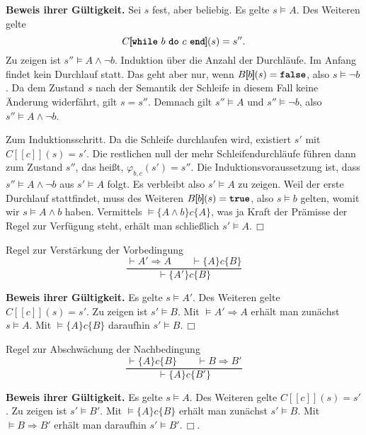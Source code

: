 \documentclass[8pt,fleqn,aspectratio=169]{beamer}
\newcommand{\strong}[1]{\textsf{\textbf{#1}}}
\renewcommand{\qedsymbol}{\ensuremath{\Box}}
\newcommand{\parspace}{\vspace{0.8em}}
\newcommand{\kw}[1]{\textbf{\texttt{#1}}}
\newcommand{\qb}[1]{[\!\![#1]\!\!]}
\begin{document}
\begin{frame}
\strong{Beweis ihrer Gültigkeit.} Sei $s$ fest, aber beliebig.
Es gelte $s\models A$. Des Weiteren gelte
\[C\qb{\text{\kw{while} $b$ \kw{do} $c$ \kw{end}}}(s) = s''.\]
Zu zeigen ist $s''\models A\land\lnot b$.\pause{} Induktion über die
Anzahl der Durchläufe. Im Anfang findet kein Durchlauf statt. Das
geht aber nur, wenn $B\qb{b}(s)=\kw{false}$, also $s\models\lnot b$.
Da dem Zustand $s$ nach der Semantik der Schleife in diesem Fall keine Änderung
widerfährt, gilt $s=s''$. Demnach gilt $s''\models A$ und $s''\models\lnot b$,
also $s''\models A\land\lnot b$.\pause

\parspace
Zum Induktionsschritt. Da die Schleife durchlaufen wird, existiert
$s'$ mit $C\qb{c}(s)=s'$. Die restlichen null der mehr Schleifendurchläufe
führen dann zum Zustand $s''$, das heißt, $\varphi_{b,c}(s')=s''$.
Die Induktionsvoraussetzung ist, dass $s''\models A\land\lnot b$
aus $s'\models A$ folgt. Es verbleibt also $s'\models A$ zu zeigen.
Weil der erste Durchlauf stattfindet, muss des Weiteren $B\qb{b}(s)=\kw{true}$,
also $s\models b$ gelten, womit wir $s\models A\land b$ haben.
Vermittels $\models\{A\land b\}c\{A\}$, was ja Kraft der Prämisse der Regel
zur Verfügung steht, erhält man schließlich $s'\models A$.\,\qedsymbol
\end{frame}

\begin{frame}
\begin{block}{Regel zur Verstärkung der Vorbedingung}
\[\dfrac{\vdash A'\Rightarrow A\qquad\vdash\{A\}c\{B\}}{
\vdash\{A'\}c\{B\}}\]
\end{block}\pause
\strong{Beweis ihrer Gültigkeit.} Es gelte $s\models A'$.
Des Weiteren gelte $C\qb{c}(s)=s'$. Zu zeigen ist $s'\models B$.\pause{}
Mit $\models A'\Rightarrow A$ erhält man zunächst $s\models A$.
Mit $\models\{A\}c\{B\}$ daraufhin $s'\models B$.\,\qedsymbol
\end{frame}

\begin{frame}
\begin{block}{Regel zur Abschwächung der Nachbedingung}
\[\dfrac{\vdash\{A\}c\{B\}\qquad\vdash B\Rightarrow B'}{
\vdash\{A\}c\{B'\}}\]
\end{block}\pause
\strong{Beweis ihrer Gültigkeit.} Es gelte $s\models A$.
Des Weiteren gelte $C\qb{c}(s)=s'$. Zu zeigen ist $s'\models B'$.\pause{}
Mit $\models\{A\}c\{B\}$ erhält man zunächst $s'\models B$. Mit
$\models B\Rightarrow B'$ erhält man daraufhin $s'\models B'$.\,\qedsymbol.
\end{frame}
\end{document}
